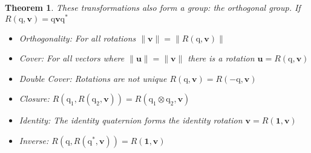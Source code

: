 \documentclass{amsart}
\newtheorem{theorem}{Theorem}[section]
\theoremstyle{definition}
\theoremstyle{remark}
\numberwithin{equation}{section}
\begin{document}
\begin{theorem}
  These transformations also form a group: the orthogonal group. If $R(\mathrm{q}, \mathbf{v})=\mathrm{q}\mathbf{v}\mathrm{q}^*$
  \begin{itemize}
  \item Orthogonality: For all rotations $\|\mathbf{v}\|=\|R(\mathrm{q}, \mathbf{v})\|$
  \item Cover: For all vectors where $\|\mathbf{u}\|=\|\mathbf{v}\|$ there is a rotation $\mathbf{u}=R(\mathrm{q}, \mathbf{v})$
  \item Double Cover: Rotations are not unique $R(\mathrm{q},\mathbf{v})=R(-\mathrm{q},\mathbf{v})$
  \item Closure: $R(\mathrm{q}_1, R(\mathrm{q}_2, \mathbf{v})) = R(\mathrm{q}_1\otimes\mathrm{q}_2, \mathbf{v})$
  \item Identity: The identity quaternion forms the identity rotation $\mathbf{v} = R(\mathbf{1}, \mathbf{v})$
  \item Inverse: $R(\mathrm{q}, R(\mathrm{q}^*, \mathbf{v})) = R(\mathbf{1}, \mathbf{v})$
  \end{itemize}
\end{theorem}
\end{document}
